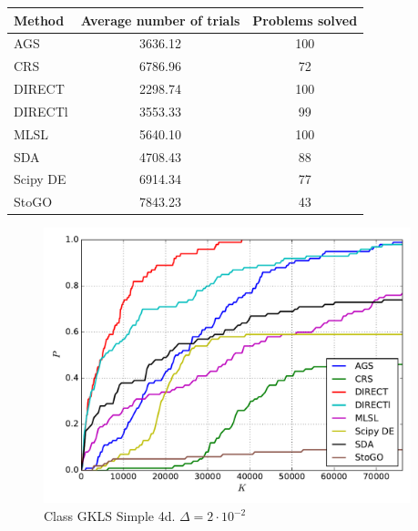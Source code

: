 \documentclass[a4paper]{article}
\begin{document}
\begin{tabular}{lcc}
\hline
 Method   &  Average number of trials  &  Problems solved  \\
\hline
 AGS      &          3636.12           &        100        \\
 CRS      &          6786.96           &        72         \\
 DIRECT   &          2298.74           &        100        \\
 DIRECTl  &          3553.33           &        99         \\
 MLSL     &          5640.10           &        100        \\
 SDA      &          4708.43           &        88         \\
 Scipy DE &          6914.34           &        77         \\
 StoGO    &          7843.23           &        43         \\
\hline
\end{tabular}
\begin{figure}[H]
  \center
  \includegraphics[width=0.95\textwidth]{../experiments/gklss4d/cmc.pdf}
  \caption{Class GKLS Simple 4d. $\Delta=2\cdot10^{-2}$}
\end{figure}
\end{document}
